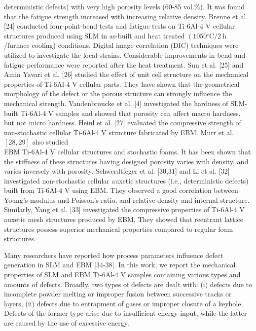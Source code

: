 \documentclass[10pt]{article}
\begin{document}
deterministic defects) with very high porosity levels (60-85 vol.\%). It was found that the fatigue strength increased with increasing relative density. Brenne et al. [24] conducted four-point-bend tests and fatigue tests on Ti-6Al-4 V cellular structures produced using SLM in as-built and heat treated $\left(1050{ }^{\circ} \mathrm{C} / 2 \mathrm{~h}\right.$ /furnace cooling) conditions. Digital image correlation (DIC) techniques were utilized to investigate the local strains. Considerable improvements in bend and fatigue performance were reported after the heat treatment. Sun et al. [25] and Amin Yavari et al. [26] studied the effect of unit cell structure on the mechanical properties of Ti-6Al-4 V cellular parts. They have shown that the geometrical morphology of the defect or the porous structure can strongly influence the mechanical strength. Vandenbroucke et al. [4] investigated the hardness of SLM-built Ti-6Al-4 V samples and showed that porosity can affect macro hardness, but not micro hardness. Heinl et al. [27] evaluated the compressive strength of non-stochastic cellular Ti-6Al-4 V structure fabricated by EBM. Murr et al. $[28,29]$ also studied\\
EBM Ti-6Al-4 V cellular structures and stochastic foams. It has been shown that the stiffness of these structures having designed porosity varies with density, and varies inversely with porosity. Schwerdtfeger et al. [30,31] and Li et al. [32] investigated non-stochastic cellular auxetic structures (i.e., deterministic defects) built from Ti-6Al-4 V using EBM. They observed a good correlation between Young's modulus and Poisson's ratio, and relative density and internal structure. Similarly, Yang et al. [33] investigated the compressive properties of Ti-6Al-4 V auxetic mesh structures produced by EBM. They showed that reentrant lattice structures possess superior mechanical properties compared to regular foam structures.

Many researchers have reported how process parameters influence defect generation in SLM and EBM [34-38]. In this work, we report the mechanical properties of SLM and EBM Ti-6Al-4 V samples containing various types and amounts of defects. Broadly, two types of defects are dealt with: (i) defects due to incomplete powder melting or improper fusion between successive tracks or layers, (ii) defects due to entrapment of gases or improper closure of a keyhole. Defects of the former type arise due to insufficient energy input, while the latter are caused by the use of excessive energy.
\end{document}
